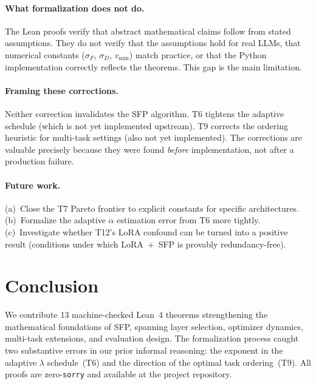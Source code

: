 \documentclass[11pt,a4paper]{article}
\theoremstyle{definition}
\begin{document}
\paragraph{What formalization does not do.} The Lean proofs verify that abstract mathematical claims follow from stated assumptions. They do not verify that the assumptions hold for real LLMs, that numerical constants ($\sigma_F$, $\sigma_D$, $v_{\min}$) match practice, or that the Python implementation correctly reflects the theorems. This gap is the main limitation.

\paragraph{Framing these corrections.} Neither correction invalidates the SFP algorithm. T6 tightens the adaptive schedule (which is not yet implemented upstream). T9 corrects the ordering heuristic for multi-task settings (also not yet implemented). The corrections are valuable precisely because they were found \emph{before} implementation, not after a production failure.

\paragraph{Future work.} (a)~Close the T7 Pareto frontier to explicit constants for specific architectures. (b)~Formalize the adaptive $\alpha$ estimation error from T6 more tightly. (c)~Investigate whether T12's LoRA confound can be turned into a positive result (conditions under which LoRA~+~SFP is provably redundancy-free).

\section{Conclusion}
\label{sec:conclusion}

We contribute 13 machine-checked Lean~4 theorems strengthening the mathematical foundations of SFP, spanning layer selection, optimizer dynamics, multi-task extensions, and evaluation design. The formalization process caught two substantive errors in our prior informal reasoning: the exponent in the adaptive $\lambda$ schedule~(T6) and the direction of the optimal task ordering~(T9). All proofs are zero-\texttt{sorry} and available at the project repository.



\end{document}
